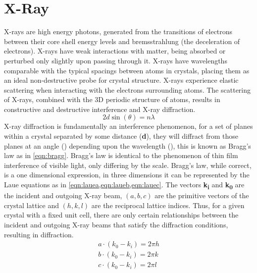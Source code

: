 \section{X-Ray}
X-rays are high energy photons, generated from the transitions of electrons between their core shell energy levels and bremsstrahlung (the deceleration of electrons).
X-rays have weak interactions with matter, being absorbed or perturbed only slightly upon passing through it.
X-rays have wavelengths comparable with the typical spacings between atoms in crystals, placing them as an ideal non-destructive probe for crystal structure.
X-rays experience elastic scattering when interacting with the electrons surrounding atoms.
The scattering of X-rays, combined with the 3D periodic structure of atoms, results in constructive and destructive interference and X-ray diffraction\cite{zavalij}.
\begin{equation}
 \label{eqn:bragg}
 2d \sin(\theta) = n \lambda
\end{equation}
X-ray diffraction is fundamentally an interference phenomenon, for a set of planes within a crystal separated by some distance (\textbf{d}), they will diffract from those planes at an angle (\textbf{\straighttheta}) depending upon the wavelength (\textbf{\textlambda{}}), this is known as Bragg's law as in \cref{eqn:bragg}.
Bragg's law is identical to the phenomenon of thin film interference of visible light, only differing by the scale.
Bragg's law, while correct, is a one dimensional expression, in three dimensions it can be represented by the Laue equations as in \cref{eqn:lauea,eqn:laueb,eqn:lauec}.
The vectors \textbf{k\textsubscript{i}} and \textbf{k\textsubscript{0}} are the incident and outgoing X-ray beam, \((a,b,c)\) are the primitive vectors of the crystal lattice and \((h,k,l)\) are the reciprocal lattice indices.
Thus, for a given crystal with a fixed unit cell, there are only certain relationships between the incident and outgoing X-ray beams that satisfy the diffraction conditions, resulting in diffraction.
\begin{align}
 a \cdot (k_0 - k_i) = 2 \pi h \label{eqn:lauea} \\
 b \cdot (k_0 - k_i) = 2 \pi k \label{eqn:laueb} \\
 c \cdot (k_0 - k_i) = 2 \pi l \label{eqn:lauec}
\end{align}

